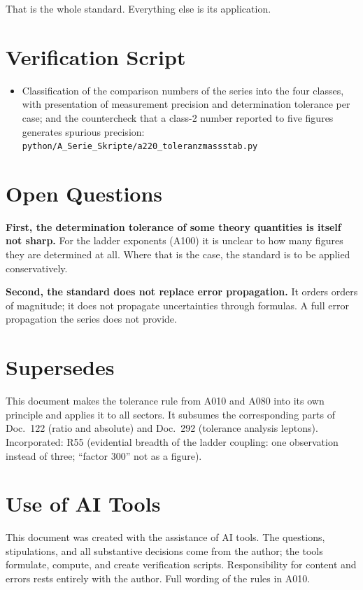 That is the whole standard. Everything else is its application.

\section{Verification Script}

\begin{itemize}
  \item Classification of the comparison numbers of the series into the four
    classes, with presentation of measurement precision and determination
    tolerance per case; and the countercheck that a class-2 number reported to
    five figures generates spurious precision:
    \texttt{python/A\_Serie\_Skripte/a220\_toleranzmassstab.py}
\end{itemize}

\section{Open Questions}

\textbf{First, the determination tolerance of some theory quantities is itself
not sharp.} For the ladder exponents (A100) it is unclear to how many figures
they are determined at all. Where that is the case, the standard is to be applied
conservatively.

\textbf{Second, the standard does not replace error propagation.} It orders orders
of magnitude; it does not propagate uncertainties through formulas. A full error
propagation the series does not provide.

\section{Supersedes}

This document makes the tolerance rule from A010 and A080 into its own principle
and applies it to all sectors. It subsumes the corresponding parts of Doc.~122
(ratio and absolute) and Doc.~292 (tolerance analysis leptons). Incorporated: R55
(evidential breadth of the ladder coupling: one observation instead of three;
``factor 300'' not as a figure).

\section{Use of AI Tools}

This document was created with the assistance of AI tools. The questions,
stipulations, and all substantive decisions come from the author; the tools
formulate, compute, and create verification scripts.
Responsibility for content and errors rests entirely with the author.
Full wording of the rules in A010.
